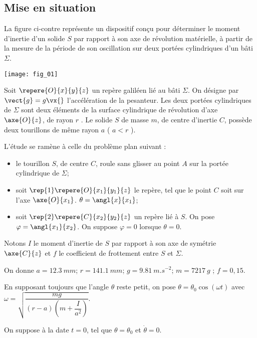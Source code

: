 \ifprof
\else
\begin{multicols}{2}
\fi


\section*{Mise en situation}
La figure ci-contre représente un dispositif conçu pour déterminer le moment d’inertie d’un solide $S$ par
rapport à son axe de révolution matérielle, à partir de la mesure de la période de son oscillation sur deux
portées cylindriques d’un bâti $\Sigma$.

\begin{center}
\texttt{[image: fig\_01]}
\end{center}
Soit $\repere{O}{x}{y}{z}$ un repère galiléen lié au bâti $\Sigma$. On désigne par $\vect{g}=g\vx{}$ l'accélération de la pesanteur. Les deux portées cylindriques de $\Sigma$ sont deux éléments de la surface cylindrique de révolution d’axe $\axe{O}{z}$, de rayon $r$ .
Le solide $S$ de masse $m$, de centre d’inertie $C$, possède deux tourillons de même rayon $a$ ( $a<r$ ).

L’étude se ramène à celle du problème plan suivant :
\begin{itemize}
\item le tourillon $S$, de centre $C$, roule sans glisser au point $A$ sur la portée cylindrique de $\Sigma$;
\item soit $\rep{1}\repere{O}{x_1}{y_1}{z}$ le repère, tel que le point $C$ soit sur l’axe $\axe{O}{x_1}$. $\theta=\angl{x}{x_1}$;
\item soit $\rep{2}\repere{C}{x_2}{y_2}{z}$ un repère lié à $S$. On pose $\varphi =\angl{x_1}{x_2}$. On suppose $\varphi=0$ lorsque $\theta=0$.
\end{itemize}
Notons $I$ le moment d’inertie de $S$ par rapport à son axe de symétrie $\axe{C}{z}$  et $f$ le coefficient de frottement entre $S$ et $\Sigma$.

On donne $a =\SI{12,3}{mm}$; $r =\SI{141,1}{mm}$; $ g = \SI{9,81}{m.s^{-2}}$; $m = \SI{7217}{g}$ ; $f = 0,15$.





En supposant toujours que l’angle $\theta$ reste petit, on pose $\theta=\theta_0\cos (\omega t)$ avec
$\omega = \sqrt{\dfrac{mg}{(r-a)\left(m+\dfrac{I}{a^2}\right)}}$.

On suppose à la date $t=0$, tel que $\theta = \theta_0$ et $\dot{\theta}=0$.


\ifprof
\else
\end{multicols}
\fi